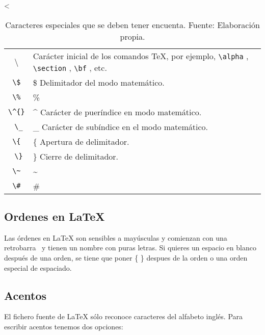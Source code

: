 <\documentclass[11pt,letter]{article} %
\begin{document}
          \begin{table}
               \centering
               \begin{tabular}{cl}
                    \textbackslash   & Carácter inicial de los comandos \TeX, por ejemplo, \verb|\alpha| , \verb|\section| , \verb|\bf| , etc. \\
                         \verb|\$|  & \$ Delimitador del modo matemático. \\
                         \verb|\%|  & \% \\
                         \verb|\^{}|  & \^{} Carácter de pueríndice en modo matemático.\\
                         \verb| \_|  & \_ Carácter de subíndice en el modo matemático. \\
                         \verb|\{|  & \{ Apertura de delimitador. \\
                         \verb| \}|  & \}  Cierre de delimitador. \\
                         \verb|\~|  & \~{} \\
                         \verb|\#|  & \# \\
               \end{tabular}
               \caption{Caracteres especiales que se deben tener encuenta. Fuente: Elaboración propia.}
          \end{table}

          \subsection{Ordenes en \LaTeX}
          \label{sec:ordenes}

          Las órdenes en \LaTeX{} son sensibles a mayúsculas y comienzan 
          con una retrobarra \ y tienen un nombre con puras letras. 
          Si quieres un espacio en blanco después de una orden, se tiene 
          que poner \{ \} despues de la orden o una orden especial de espaciado.

          \subsection{Acentos}
          \label{sec:acentos}

          El fichero fuente de \LaTeX{} sólo reconoce caracteres del alfabeto 
          inglés. Para escribir acentos tenemos dos opciones:
\end{document}
